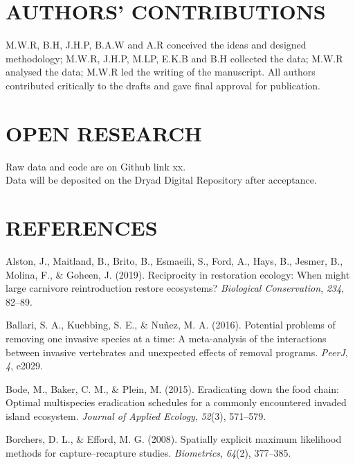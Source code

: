 \documentclass[]{elsarticle} %
\begin{document}
\hypertarget{authors-contributions}{%
\section{AUTHORS' CONTRIBUTIONS}\label{authors-contributions}}

M.W.R, B.H, J.H.P, B.A.W and A.R conceived the ideas and designed methodology; M.W.R, J.H.P, M.LP, E.K.B and B.H collected the data; M.W.R analysed the data; M.W.R led the writing of the manuscript. All authors contributed critically to the drafts and gave final approval for publication.

\hypertarget{open-research}{%
\section{OPEN RESEARCH}\label{open-research}}

Raw data and code are on Github link xx.\\
Data will be deposited on the Dryad Digital Repository after acceptance.

\newpage

\hypertarget{references}{%
\section*{REFERENCES}\label{references}}

\hypertarget{refs}{}
\leavevmode\hypertarget{ref-alston2019}{}%
Alston, J., Maitland, B., Brito, B., Esmaeili, S., Ford, A., Hays, B., Jesmer, B., Molina, F., \& Goheen, J. (2019). Reciprocity in restoration ecology: When might large carnivore reintroduction restore ecosystems? \emph{Biological Conservation}, \emph{234}, 82--89.

\leavevmode\hypertarget{ref-ballari2016}{}%
Ballari, S. A., Kuebbing, S. E., \& Nuñez, M. A. (2016). Potential problems of removing one invasive species at a time: A meta-analysis of the interactions between invasive vertebrates and unexpected effects of removal programs. \emph{PeerJ}, \emph{4}, e2029.

\leavevmode\hypertarget{ref-bode2015}{}%
Bode, M., Baker, C. M., \& Plein, M. (2015). Eradicating down the food chain: Optimal multispecies eradication schedules for a commonly encountered invaded island ecosystem. \emph{Journal of Applied Ecology}, \emph{52}(3), 571--579.

\leavevmode\hypertarget{ref-borchers2008}{}%
Borchers, D. L., \& Efford, M. G. (2008). Spatially explicit maximum likelihood methods for capture--recapture studies. \emph{Biometrics}, \emph{64}(2), 377--385.
\end{document}

